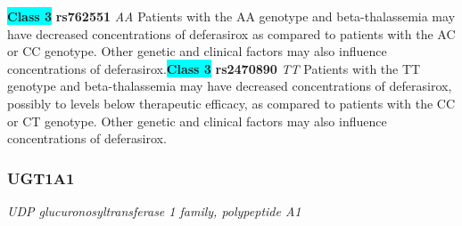\documentclass{report}
\begin{document}
\textbf{\colorbox{cyan} {Class 3}} \textbf{ rs762551 } \textit{ AA }
Patients with the AA genotype and beta-thalassemia may have decreased concentrations of deferasirox as compared to patients with the AC or CC genotype. Other genetic and clinical factors may also influence concentrations of deferasirox.\newline\textbf{\colorbox{cyan} {Class 3}} \textbf{ rs2470890 } \textit{ TT }
Patients with the TT genotype and beta-thalassemia may have decreased concentrations of deferasirox, possibly to levels below therapeutic efficacy, as compared to patients with the CC or CT genotype. Other genetic and clinical factors may also influence concentrations of deferasirox.\newline\subsubsection{ UGT1A1 }
\textit{ UDP glucuronosyltransferase 1 family, polypeptide A1 }
\end{document}
